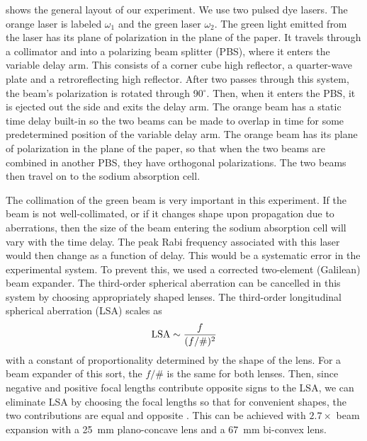 \begin{figure}[tbp]
\bigskip
{}
\end{figure}

\hspace{\parindent}  shows the general layout of 
our experiment.  We use two pulsed dye lasers.  The orange laser is labeled
$\omega_1$ and the green laser $\omega_2$.  The green light emitted from the
laser has its plane of polarization in the plane of the paper.  It travels
through a collimator and into a polarizing beam splitter (PBS), where it enters
the variable delay arm.  This consists of a corner cube high reflector, a
quarter-wave plate and a retroreflecting high reflector.  After two passes
through this system, the beam's polarization is rotated through
90$^{\circ}$.  Then, when it enters the PBS, it is ejected out the side and
exits the delay arm.  The orange beam has a static time delay built-in so the
two beams can be made to overlap in time for some predetermined position of
the variable delay arm.  The orange beam has its plane of polarization in the
plane of the paper, so that when the two beams are combined in another PBS, they
have orthogonal polarizations.  The two beams then travel on to the sodium
absorption cell.

The collimation of the green beam is very important in this experiment.  If the
beam is not well-collimated, or if it changes shape upon propagation due to
aberrations, then the size of the beam entering the sodium absorption cell will
vary with the time delay.  The peak Rabi frequency associated with
this laser would then change as a function of delay.  This would be a
systematic error in the experimental system.  To prevent this, we used a
corrected two-element (Galilean) beam expander.  The third-order spherical
aberration can be cancelled in this system by choosing appropriately shaped
lenses.  The third-order longitudinal spherical aberration (LSA) scales as
\begin{equation}
{\rm LSA} \sim \frac{f}{(f/\#)^2}
\end{equation}
with a constant of proportionality determined by the shape of the lens. For
a beam expander of this sort, the $f/\#$ is the same for both lenses. 
Then, since negative and positive focal lengths contribute opposite signs to
the LSA, we can eliminate LSA by choosing the focal lengths so that for
convenient shapes, the two contributions are equal and opposite
\cite{Melles_Griot}.  This can be achieved with $2.7 \times$ beam expansion with
a 25~mm plano-concave lens and a 67~mm bi-convex lens.

